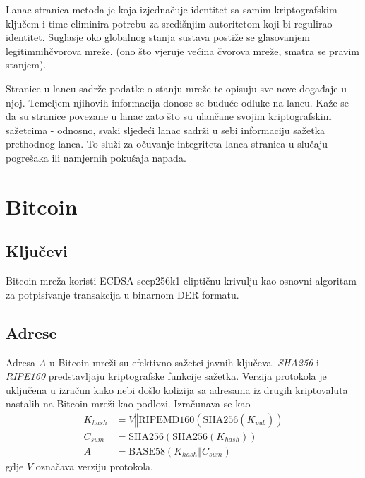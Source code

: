 \documentclass[utf8, zavrsni]{fer}
\begin{document}
Lanac stranica metoda je koja izjednačuje identitet sa samim kriptografskim ključem i time eliminira potrebu za središnjim autoritetom koji bi regulirao identitet. Suglasje oko globalnog stanja sustava postiže se glasovanjem legitimnih\footnotemark čvorova mreže. (ono što vjeruje većina čvorova mreže, smatra se pravim stanjem).

Stranice u lancu sadrže podatke o stanju mreže te opisuju sve nove događaje u njoj. Temeljem njihovih informacija donose se buduće odluke na lancu. Kaže se da su stranice povezane u lanac zato što su ulančane svojim kriptografskim sažetcima - odnosno, svaki sljedeći lanac sadrži u sebi informaciju sažetka prethodnog lanca. To služi za očuvanje integriteta lanca stranica u slučaju pogrešaka ili namjernih pokušaja napada.


\section{Bitcoin}
\subsection{Ključevi}
Bitcoin mreža koristi ECDSA secp256k1 eliptičnu krivulju kao osnovni algoritam za potpisivanje transakcija u binarnom DER formatu.
\subsection{Adrese}
Adresa $A$ u Bitcoin mreži su efektivno sažetci javnih ključeva. \textit{SHA256} i \textit{RIPE160} predstavljaju kriptografske funkcije sažetka. Verzija protokola je uključena u izračun kako nebi došlo kolizija sa adresama iz drugih kriptovaluta nastalih na Bitcoin mreži kao podlozi. Izračunava se kao
\begin{equation} \label{eq2}
\begin{split}
K_{hash} &= V \mathbin\Vert \mathrm{RIPEMD160}(\mathrm{SHA256}(K_{pub})) \\
C_{sum}  &= \mathrm{SHA256}(\mathrm{SHA256}(K_{hash})) \\
A        &= \mathrm{BASE58}(K_{hash} \mathbin\Vert C_{sum})
\end{split}
\end{equation}
gdje $ V $ označava verziju protokola.
\end{document}
